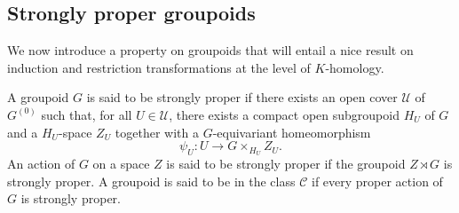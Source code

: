 


\subsection{Strongly proper groupoids}

We now introduce a property on groupoids that will entail a nice result on induction and restriction transformations at the level of $K$-homology.

\begin{definition}\label{StronglyProper}
A groupoid $G$ is said to be strongly proper if there exists an open cover $\mathcal U$ of $G^{(0)}$ such that, for all $U\in\mathcal U$, there exists a compact open subgroupoid $H_U$ of $G$ and a $H_U$-space $Z_U$ together with a $G$-equivariant homeomorphism
\[\psi_U : U \rightarrow G\times_{H_U} Z_U.\] 
An action of $G$ on a space $Z$ is said to be strongly proper if the groupoid $Z\rtimes G$ is strongly proper. A groupoid is said to be in the class $\mathcal C$ if every proper action of $G$ is strongly proper.
\end{definition}


